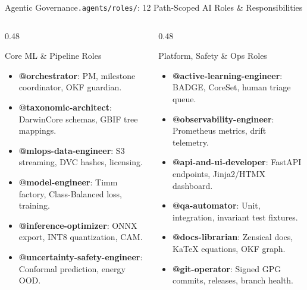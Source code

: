 \begin{frame}{Agentic Governance}{\texttt{.agents/roles/}: 12 Path-Scoped AI Roles \& Responsibilities}
    \begin{columns}[T]
        \begin{column}{0.48\textwidth}
            \begin{block}{Core ML \& Pipeline Roles}
                \begin{itemize}\scriptsize
                    \item \textbf{@orchestrator}: PM, milestone coordinator, OKF guardian.
                    \item \textbf{@taxonomic-architect}: DarwinCore schemas, GBIF tree mappings.
                    \item \textbf{@mlops-data-engineer}: S3 streaming, DVC hashes, licensing.
                    \item \textbf{@model-engineer}: Timm factory, Class-Balanced loss, training.
                    \item \textbf{@inference-optimizer}: ONNX export, INT8 quantization, CAM.
                    \item \textbf{@uncertainty-safety-engineer}: Conformal prediction, energy OOD.
                \end{itemize}
            \end{block}
        \end{column}
        \begin{column}{0.48\textwidth}
            \begin{block}{Platform, Safety \& Ops Roles}
                \begin{itemize}\scriptsize
                    \item \textbf{@active-learning-engineer}: BADGE, CoreSet, human triage queue.
                    \item \textbf{@observability-engineer}: Prometheus metrics, drift telemetry.
                    \item \textbf{@api-and-ui-developer}: FastAPI endpoints, Jinja2/HTMX dashboard.
                    \item \textbf{@qa-automator}: Unit, integration, invariant test fixtures.
                    \item \textbf{@docs-librarian}: Zensical docs, KaTeX equations, OKF graph.
                    \item \textbf{@git-operator}: Signed GPG commits, releases, branch health.
                \end{itemize}
            \end{block}
        \end{column}
    \end{columns}


\end{frame}
